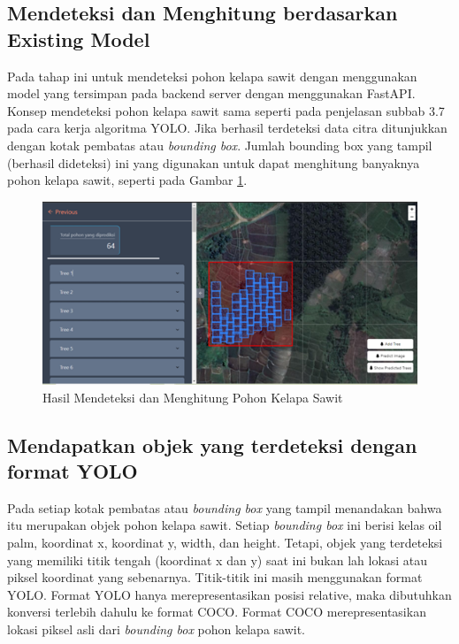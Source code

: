 \subsection{Mendeteksi dan Menghitung berdasarkan Existing Model}
\hspace{1,2cm}
Pada tahap ini untuk mendeteksi pohon kelapa sawit dengan menggunakan model yang tersimpan pada backend server dengan menggunakan FastAPI. Konsep mendeteksi pohon kelapa sawit sama seperti pada penjelasan subbab 3.7 pada cara kerja algoritma YOLO. Jika berhasil terdeteksi data citra ditunjukkan dengan kotak pembatas atau \textit{bounding box}. Jumlah bounding box yang tampil (berhasil dideteksi) ini yang digunakan untuk dapat menghitung banyaknya pohon kelapa sawit, seperti pada Gambar \ref{img:Hasil-Mendeteksi-dan-Menghitung-Pohon-Kelapa-Sawit}.

\begin{figure}[H]
	\vspace{-0.1cm}
	\begin{center}
		\includegraphics[width=1\columnwidth]{bab4/Gambar/Picture37.png}
	\end{center}
	\vspace{-0.2cm}
	\captionsetup{justification=centering}
	\caption{Hasil Mendeteksi dan Menghitung Pohon Kelapa Sawit}\label{img:Hasil-Mendeteksi-dan-Menghitung-Pohon-Kelapa-Sawit}
\end{figure}

\subsection{Mendapatkan objek yang terdeteksi dengan format YOLO}
\hspace{1,2cm}
Pada setiap kotak pembatas atau \textit{bounding box} yang tampil menandakan bahwa itu merupakan objek pohon kelapa sawit. Setiap \textit{bounding box} ini berisi kelas oil palm, koordinat x, koordinat y, width, dan height. Tetapi, objek yang terdeteksi yang memiliki titik tengah (koordinat x dan y) saat ini bukan lah lokasi atau piksel koordinat yang sebenarnya. Titik-titik ini masih menggunakan format YOLO. Format YOLO hanya merepresentasikan posisi relative, maka dibutuhkan konversi terlebih dahulu ke format COCO. Format COCO merepresentasikan lokasi piksel asli dari \textit{bounding box} pohon kelapa sawit.

